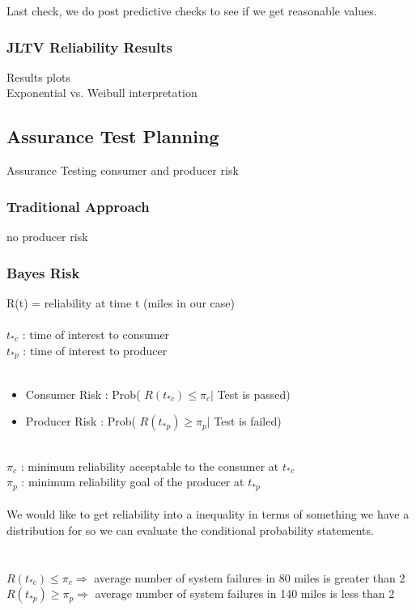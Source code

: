 \documentclass[12pt]{article}
\begin{document}
Last check, we do post predictive checks to see if we get reasonable values.

\subsubsection{JLTV Reliability Results}

Results plots \\
Exponential vs. Weibull interpretation

\subsection{Assurance Test Planning}
Assurance Testing
consumer and producer risk

\subsubsection{Traditional Approach}
no producer risk

\subsubsection{Bayes Risk}

R(t) = reliability at time t (miles in our case)
\\
\\$ t_{*c} $ : time of interest to consumer
\\$ t_{*p} $ : time of interest to producer
\\
\\
\begin{itemize}
\item Consumer Risk :   Prob( $ R(t_{*c}) \leq \pi_c \vert $ Test is passed)
\item Producer Risk :   Prob( $ R(t_{*p}) \geq \pi_p \vert $ Test is failed)
\end{itemize}
\
\\$ \pi_c $ : minimum reliability acceptable to the consumer at $ t_{*c} $
\\$ \pi_p $ : minimum reliability goal of the producer at $ t_{*p} $
\\
\\
We would like to get reliability into a inequality in terms of something we have
a distribution for so we can evaluate the conditional probability statements.
\\
\\
\\$ R(t_{*c}) \leq \pi_c \Rightarrow $ average number of system failures in 80
miles is greater than 2
\\$ R(t_{*p}) \geq \pi_p \Rightarrow $ average number of system failures in 140
miles is less than 2
\end{document}
